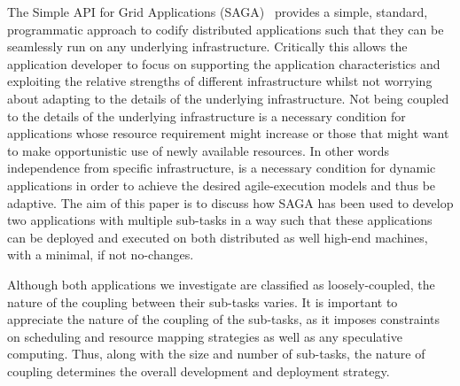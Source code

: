 \documentclass[conference,final]{IEEEtran}
\newcommand{\jhanote}[1]{ {\textcolor{red} { ***SJ: #1 }}}
\newcommand{\jhanote}[1]{}
\begin{document}

The Simple API for Grid Applications (SAGA)~\cite{saga-core, saga_url}
provides a simple, standard, programmatic approach to codify
distributed applications such that they can be seamlessly run on any
underlying infrastructure. Critically this allows the application
developer to focus on supporting the application characteristics and
exploiting the relative strengths of different infrastructure whilst
not worrying about adapting to the details of the underlying
infrastructure. Not being coupled to the details of the underlying
infrastructure is a necessary condition for applications whose
resource requirement might increase or those that might want to make
opportunistic use of newly available resources. In other words
independence from specific infrastructure, is a necessary condition
for dynamic applications in order to achieve the desired
agile-execution models and thus be adaptive.  The aim of this paper is
to discuss how SAGA has been used to develop two applications with
multiple sub-tasks in a way such that these applications can be
deployed and executed on both distributed as well high-end machines,
with a minimal, if not no-changes.


Although both applications we investigate are classified as
loosely-coupled, the nature of the coupling between their sub-tasks
varies. It is important to appreciate the nature of the coupling of
the sub-tasks, as it imposes constraints on scheduling and resource
mapping strategies as well as any speculative computing.  Thus, along
with the size and number of sub-tasks, the nature of coupling
determines the overall development and deployment strategy.

\end{document}
